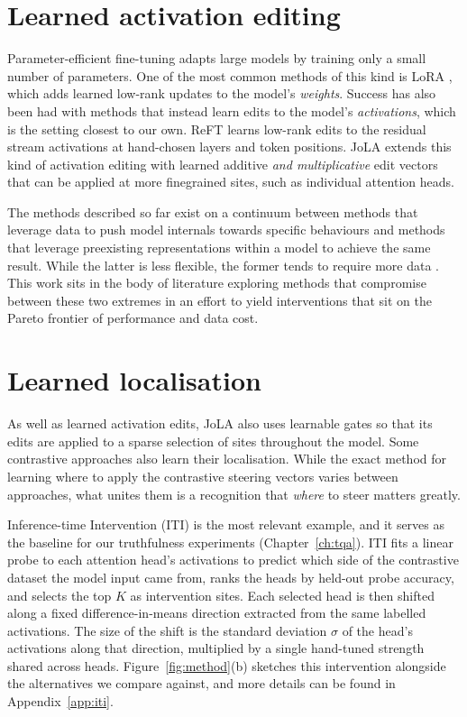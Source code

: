 \documentclass[logo,msc,notimes]{infthesis}
\begin{document}
\section{Learned activation editing}
Parameter-efficient fine-tuning adapts large models by training only a small number of parameters.
One of the most common methods of this kind is LoRA \citep{hu2022lora}, which adds learned low-rank updates to the
model's \emph{weights}. Success has also been had with methods that instead learn edits to the
model's \emph{activations}, which is the setting closest to our own. ReFT \citep{wu2024reft} learns
low-rank edits to the residual stream activations at hand-chosen layers and token positions. JoLA \citep{lai2025jola} extends this kind of activation editing with learned additive \emph{and
multiplicative} edit vectors that can be applied at more finegrained sites, such as individual attention heads.

The methods described so far exist on a continuum between methods that leverage data to push model internals towards specific behaviours and methods that leverage preexisting representations within a model to achieve the same result. While the latter is less flexible, the former tends to require more data \citep{wehner2025repe}. This work sits in the body of literature exploring methods that compromise between these two extremes in an effort to yield interventions that sit on the Pareto frontier of performance and data cost.

\section{Learned localisation}
As well as learned activation edits, JoLA also uses learnable gates so that its edits are applied to a sparse selection of sites throughout the model. Some contrastive approaches also learn their localisation. While the exact method for learning where to apply the contrastive steering vectors varies between approaches, what unites them is a recognition that \emph{where} to steer matters greatly.

Inference-time Intervention (ITI) \citep{li2023iti} is the most relevant example, and it serves as
the baseline for our truthfulness experiments (Chapter~\ref{ch:tqa}). ITI fits a linear probe to
each attention head's activations to predict which side of the contrastive dataset the model input came from, ranks the heads by held-out probe
accuracy, and selects the top $K$ as intervention sites. Each selected head is then shifted along a
fixed difference-in-means direction extracted from the same labelled activations. The size of the
shift is the standard deviation $\sigma$ of the head's activations along that direction, multiplied by a
single hand-tuned strength shared across heads. Figure~\ref{fig:method}(b) sketches this intervention
alongside the alternatives we compare against, and more details can be found in
Appendix~\ref{app:iti}.
\end{document}

